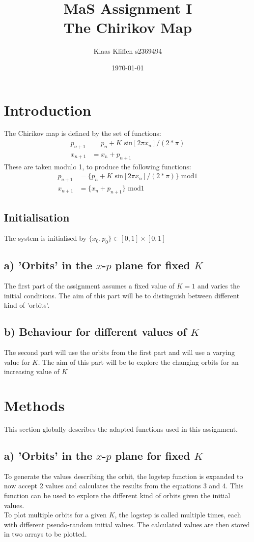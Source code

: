 \documentclass{article}
\title{MaS Assignment I\\
\large The Chirikov Map}
\author{Klaas Kliffen s2369494}
\date{\today}
\begin{document}
\maketitle

\section{Introduction}

The Chirikov map is defined by the set of functions:
\begin{align} 
p_{n+1} &= p_n + K \text{ sin}[2\pi x_n] / (2*\pi)\\
x_{n+1} &= x_n + p_{n+1}
\end{align}
These are taken modulo 1, to produce the following functions:
\begin{align} 
p_{n+1} &= \{p_n + K \text{ sin}[2\pi x_n] / (2*\pi)\} \text{ mod} 1\\ 
x_{n+1} &= \{x_n + p_{n+1}\} \text{ mod} 1
\end{align}

\subsection*{Initialisation}
The system is initialised by $\{x_0,p_0\} \in [0,1] \times [0,1]$

\subsection*{a) 'Orbits' in the $x$-$p$ plane for fixed $K$}
The first part of the assignment assumes a fixed value of $K = 1$ and varies the initial conditions. The aim of this part will be to distinguish between different kind of 'orbits'.

\subsection*{b) Behaviour for different values of $K$}
The second part will use the orbits from the first part and will use a varying value for $K$.
The aim of this part will be to explore the changing orbits for an increasing value of $K$

\section{Methods}
This section globally describes the adapted functions used in this assignment.

\subsection*{a) 'Orbits' in the $x$-$p$ plane for fixed $K$}
To generate the values describing the orbit, the logstep function is expanded to now accept 2 values and calculates the results from the equations 3 and 4.
This function can be used to explore the different kind of orbits given the initial values.\\
To plot multiple orbits for a given $K$, the logstep is called multiple times, each with different pseudo-random initial values. The calculated values are then stored in two arrays to be plotted.
\end{document}
